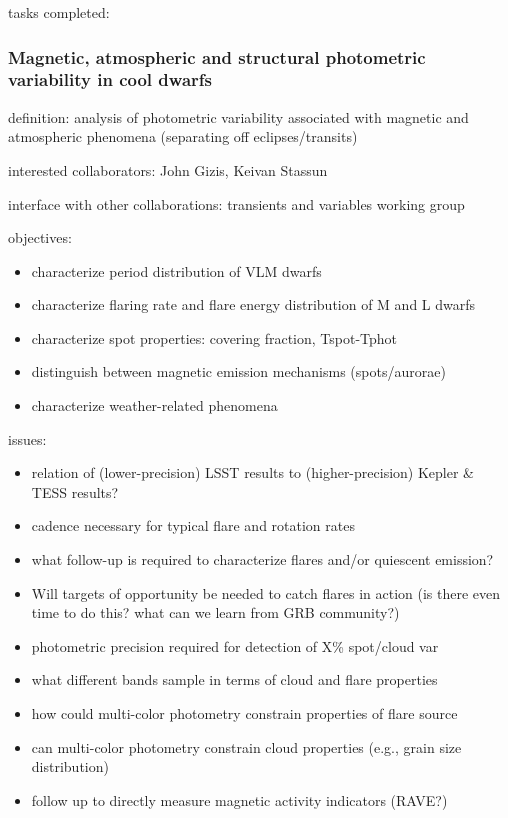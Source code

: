 tasks completed: 


\subsubsection{Magnetic, atmospheric and structural photometric variability in cool dwarfs}

definition: analysis of photometric variability associated with magnetic and atmospheric  phenomena (separating off eclipses/transits) 

interested collaborators: 
John Gizis,  Keivan Stassun 

interface with other collaborations: 
transients and variables working group  

objectives: 
\begin{itemize}
\item{characterize 
period distribution of VLM dwarfs }
\item{characterize 
flaring rate and flare energy distribution of M and L dwarfs }
\item{characterize 
spot properties: covering fraction, Tspot-Tphot }
\item{distinguish 
between magnetic emission mechanisms (spots/aurorae) }
\item{characterize weather-related phenomena }
\end{itemize}


issues: 
\begin{itemize}
\item{relation 
of (lower-precision) LSST results to (higher-precision) Kepler \& TESS results? }
\item{cadence 
necessary for typical flare and rotation rates }
\item{what 
follow-up is required to characterize flares and/or quiescent emission? }
\item{Will 
targets of opportunity be needed to catch flares in action (is there even time to do 
this? what can we learn from GRB community?) }
\item{ photometric 
precision required for detection of X\% spot/cloud var }
\item{ what 
different bands sample in terms of cloud and flare properties }
\item{how 
could multi-color photometry constrain properties of flare source }
\item{can 
multi-color photometry constrain cloud properties (e.g., grain size distribution)}
\item{follow 
up to directly measure magnetic activity indicators (RAVE?) }
\end{itemize}

